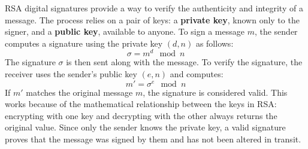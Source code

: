 RSA digital signatures provide a way to verify the authenticity and integrity of a message.
The process relies on a pair of keys: a \textbf{private key}, known only to the signer,
and a \textbf{public key}, available to anyone. To sign a message $m$, the sender computes
a signature using the private key $(d, n)$ as follows:
   $$ \sigma = m^d \mod n$$
The signature $\sigma$ is then sent along with the message. To verify the signature,
the receiver uses the sender's public key $(e, n)$ and computes:
  $$  m' = \sigma^e \mod n$$
If $m'$ matches the original message $m$, the signature is considered valid. This works
because of the mathematical relationship between the keys in RSA: encrypting with one key
and decrypting with the other always returns the original value. Since only the sender
knows the private key, a valid signature proves that the message was signed by them and
has not been altered in transit.


